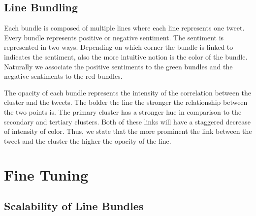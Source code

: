 \documentclass[journal]{vgtc}                %
\begin{document}
\subsection{Line Bundling}
Each bundle is composed of multiple lines where each line represents one tweet. Every bundle represents positive or negative sentiment. The sentiment is represented in two ways. Depending on which corner the bundle is linked to indicates the sentiment, also the more intuitive notion is the color of the bundle. Naturally we associate the positive sentiments to the green bundles and the negative sentiments to the red bundles.

The opacity of each bundle represents the intensity of the correlation between the cluster and the tweets. The bolder the line the stronger the relationship between the two points is. The primary cluster has a stronger hue in comparison to the secondary and tertiary clusters. Both of these links will have a staggered decrease of intensity of color. Thus, we state that the more prominent the link between the tweet and the cluster the higher the opacity of the line.

\section{Fine Tuning}

\subsection{Scalability of Line Bundles}

\newpage
\end{document}
